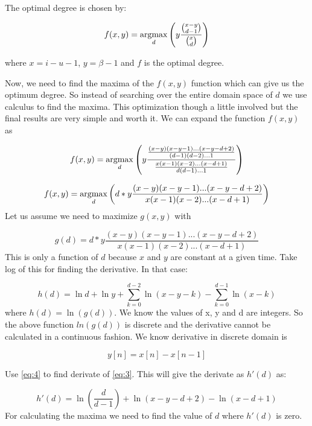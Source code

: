 The optimal degree is chosen by:

\begin{equation} \label{eq:1}
	f(x,y) = \operatorname*{argmax}_{d} \left(y\frac{\binom{x-y}{d-1}}{\binom{x}{d}}\right)
\end{equation}

where $x=i-u-1$, $y=\beta-1$ and $f$ is the optimal degree. 

Now, we need to find the maxima of the $f(x,y)$ function which can give us the optimum degree. So instead of searching over the entire domain space of $d$ we use calculus to find the maxima. This optimization though a little involved but the final results are very simple and worth it. We can expand the function $f(x,y)$ as

{\large\[
f(x,y) = \operatorname*{argmax}_{d} \left(y\frac{\frac{(x-y)(x-y-1)...(x-y-d+2)}{(d-1)(d-2)...1}}{\frac{x(x-1)(x-2)...(x-d+1)}{d(d-1)...1}}\right)
\]}


\[
f(x,y) = \operatorname*{argmax}_{d} 	\left(d*y\frac{(x-y)(x-y-1)...(x-y-d+2)}{x(x-1)(x-2)...(x-d+1)}\right)
\]
\linebreak
Let us assume we need to maximize $g(x,y)$ with

\begin{equation} \label{eq:2}
	g(d) = d*y\frac{(x-y)(x-y-1)...(x-y-d+2)}{x(x-1)(x-2)...(x-d+1)}
\end{equation}
This is only a function of $d$ because $x$ and $y$ are constant at a given time. Take log of this for finding the derivative. In that case:

\begin{equation} \label{eq:3}
	h(d) = \ln d + \ln y + \sum_{k=0}^{d-2}{\ln(x-y-k)} - \sum_{k=0}^{d-1}{\ln(x-k)}
\end{equation}
\linebreak
where $h(d) = \ln(g(d))$. We know the values of x, y and d are integers. So the above function $ln(g(d))$ is discrete and the derivative cannot be calculated in a continuous fashion. We know derivative in discrete domain is

\begin{equation} \label{eq:4}
	y[n] = x[n] - x[n-1]
\end{equation}

Use \ref{eq:4} to find derivate of \ref{eq:3}. This will give the derivate as $h'(d)$ as:

\begin{equation} \label{eq:5}
	h'(d) = \ln({\frac{d}{d-1}}) + \ln(x-y-d+2) - \ln(x-d+1) 	
\end{equation}
For calculating the maxima we need to find the value of $d$ where $h'(d)$ is zero.

